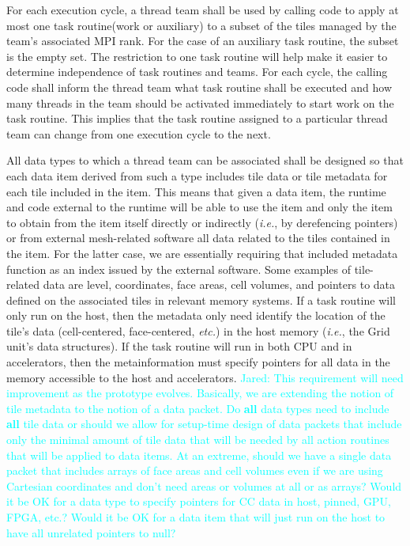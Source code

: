\documentclass{article}
\newcommand{\ie}{\textit{i.e.}}   %
\newcommand{\Jared}[1]          {\textcolor{cyan}{Jared: #1}}
\newcommand{\taskroutine}        {task routine\xspace}
\newcommand{\taskroutines}       {task routines\xspace}
\begin{document}
\begin{req}
For each execution cycle, a thread team shall be used by calling code to apply at
most one \taskroutine (work or auxiliary) to a subset of the tiles managed by
the team's associated MPI rank.  For the case of an auxiliary \taskroutine, the
subset is the empty set.  The restriction to one \taskroutine will help make it
easier to determine independence of \taskroutines and teams.  For each cycle,
the calling code shall inform the thread team what \taskroutine shall be executed
and how many threads in the team should be activated immediately to start work
on the \taskroutine.  This implies that the \taskroutine assigned to a
particular thread team can change from one execution cycle to the next.
\end{req}

\begin{req}
All data types to which a thread team can be associated shall be designed so
that each data item derived from such a type includes tile data or tile metadata
for each tile included in the item.  This means that given a data item, the
runtime and code external to the runtime will be able to use the item and only
the item to obtain from the item itself directly or indirectly (\ie, by
derefencing pointers) or from external mesh-related software all data related to
the tiles contained in the item.  For the latter case, we are essentially
requiring that included metadata function as an index issued by the external
software.  Some examples of tile-related data are level, coordinates, face
areas, cell volumes, and pointers to data defined on the associated tiles in
relevant memory systems.  If a \taskroutine will only run on the host, then the
metadata only need identify the location of the tile's data (cell-centered,
face-centered, \textit{etc.}) in the host memory (\ie, the Grid unit's data
structures).  If the \taskroutine will run in both CPU and in accelerators, then
the metainformation must specify pointers for all data in the memory accessible
to the host and accelerators.  \Jared{This requirement will need improvement as
the prototype evolves.  Basically, we are extending the notion of tile metadata
to the notion of a data packet.  Do \textbf{all} data types need to include
\textbf{all} tile data or should we allow for setup-time design of data packets
that include only the minimal amount of tile data that will be needed by all
action routines that will be applied to data items.  At an extreme, should we
have a single data packet that includes arrays of face areas and cell volumes
even if we are using Cartesian coordinates and don't need areas or volumes at
all or as arrays?  Would it be OK for a data type to specify pointers for CC
data in host, pinned, GPU, FPGA, etc.?  Would it be OK for a data item that will
just run on the host to have all unrelated pointers to null?}
\end{req}
\end{document}

